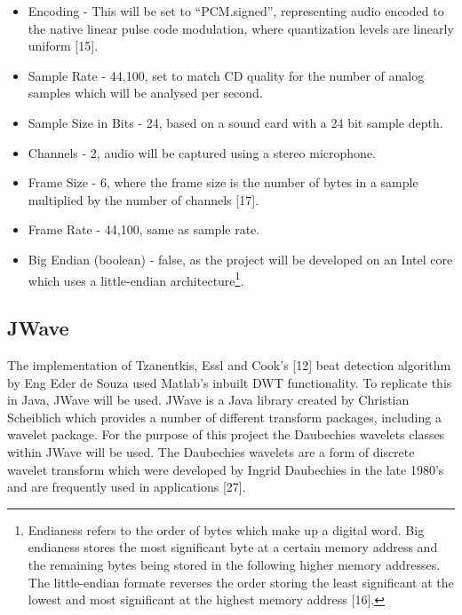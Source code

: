 \documentclass[a4paper, 11pt]{article}
\begin{document}
\begin{itemize}
\item Encoding - This will be set to ``PCM.signed'', representing audio encoded to the native linear pulse code modulation, where quantization levels are linearly uniform [15].
\item Sample Rate - 44,100, set to match CD quality for the number of analog samples which will be analysed per second. 
\item Sample Size in Bits - 24, based on a sound card with a 24 bit sample depth.
\item Channels - 2, audio will be captured using a stereo microphone.
\item Frame Size - 6, where the frame size is the number of bytes in a sample multiplied by the number of channels [17].
\item Frame Rate - 44,100, same as sample rate.
\item Big Endian (boolean) - false, as the project will be developed on an Intel core which uses a little-endian architecture\footnote{Endianess refers to the order of bytes which make up a digital word. Big endianess stores the most significant byte at a certain memory address and the remaining bytes being stored in the following higher memory addresses. The little-endian formate reverses the order storing the least significant at the lowest and most significant at the highest memory address [16].}.
\end{itemize}

\subsection{JWave}
The implementation of Tzanentkis, Essl and Cook's [12] beat detection algorithm by Eng Eder de Souza used Matlab's inbuilt DWT functionality. To replicate this in Java, JWave will be used. JWave is a Java library created by Christian Scheiblich which provides a number of different transform packages, including a wavelet package. For the purpose of this project the Daubechies wavelets classes within JWave will be used. The Daubechies wavelets are a form of discrete wavelet transform which were developed by Ingrid Daubechies in the late 1980's and are frequently used in applications [27]. 
\end{document}
